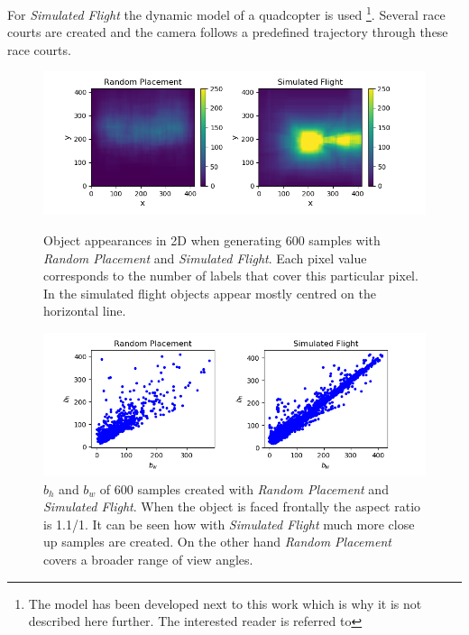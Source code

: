 For \textit{Simulated Flight} the dynamic model of a quadcopter is used \footnote{The model has been developed next to this work which is why it is not described here further. The interested reader is referred to }. Several race courts are created and the camera follows a predefined trajectory through these race courts.

\begin{figure}
	\begin{minipage}{\textwidth}
		\includegraphics[width=\textwidth]{fig/heatmap_camplace}
		\caption{Object appearances in 2D when generating 600 samples with \textit{Random Placement} and  \textit{Simulated Flight}. Each pixel value corresponds to the number of labels that cover this particular pixel. In the simulated flight objects appear mostly centred on the horizontal line.}
		\label{fig:heatmap_camplace}
	\end{minipage}
	\begin{minipage}{\textwidth}
	\includegraphics[width=\textwidth]{fig/ar_train}
	\caption{$b_h$ and $b_w$ of 600 samples created with \textit{Random Placement} and  \textit{Simulated Flight}. When the object is faced frontally the aspect ratio is 1.1/1. It can be seen how with \textit{Simulated Flight} much more close up samples are created. On the other hand \textit{Random Placement} covers a broader range of view angles.}
	\label{fig:aspect_ratio_camplace}
	\end{minipage}
\end{figure}

